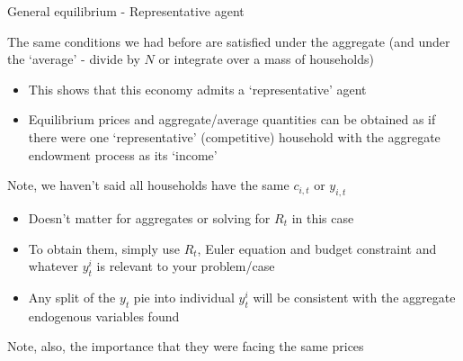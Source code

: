 \begin{frame}{General equilibrium - Representative agent}

The same conditions we had before are satisfied under the aggregate (and under the `average' - divide by $N$ or integrate over a mass of households)
\begin{itemize}
\item	This shows that this economy admits a `representative' agent
\item	Equilibrium prices and aggregate/average quantities can be obtained as if there were one `representative' (competitive) household with the aggregate endowment process as its `income'
\end{itemize}

\vspace{2mm}
Note, we haven't said all households have the same $c_{i,t}$ or $y_{i,t}$
\begin{itemize}
\item	Doesn't matter for aggregates or solving for $R_{t}$ in this case
\item	To obtain them, simply use $R_{t}$, Euler equation and budget constraint and whatever $y_{t}^{i}$ is relevant to your problem/case
\item	Any split of the $y_{t}$ pie into individual $y^{i}_{t}$ will be consistent with the aggregate endogenous variables found
\end{itemize}

\vspace{2mm}
Note, also, the importance that they were facing the same prices

\end{frame}


